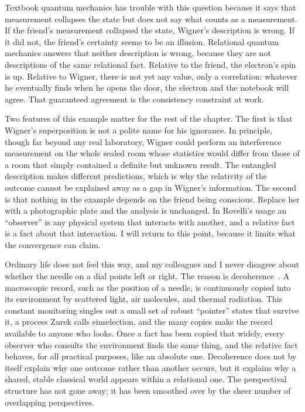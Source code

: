 Textbook quantum mechanics has trouble with this question because it says that measurement collapses the state but does not say what counts as a measurement.
If the friend's measurement collapsed the state, Wigner's description is wrong.
If it did not, the friend's certainty seems to be an illusion.
Relational quantum mechanics answers that neither description is wrong, because they are not descriptions of the same relational fact.
Relative to the friend, the electron's spin is up.
Relative to Wigner, there is not yet any value, only a correlation: whatever he eventually finds when he opens the door, the electron and the notebook will agree.
That guaranteed agreement is the consistency constraint at work.

Two features of this example matter for the rest of the chapter.
The first is that Wigner's superposition is not a polite name for his ignorance.
In principle, though far beyond any real laboratory, Wigner could perform an interference measurement on the whole sealed room whose statistics would differ from those of a room that simply contained a definite but unknown result.
The entangled description makes different predictions, which is why the relativity of the outcome cannot be explained away as a gap in Wigner's information.
The second is that nothing in the example depends on the friend being conscious.
Replace her with a photographic plate and the analysis is unchanged.
In Rovelli's usage an ``observer'' is any physical system that interacts with another, and a relative fact is a fact about that interaction.
I will return to this point, because it limits what the convergence can claim.

Ordinary life does not feel this way, and my colleagues and I never disagree about whether the needle on a dial points left or right.
The reason is decoherence~\citep{Zurek2003}.
A macroscopic record, such as the position of a needle, is continuously copied into its environment by scattered light, air molecules, and thermal radiation.
This constant monitoring singles out a small set of robust ``pointer'' states that survive it, a process Zurek calls einselection, and the many copies make the record available to anyone who looks.
Once a fact has been copied that widely, every observer who consults the environment finds the same thing, and the relative fact behaves, for all practical purposes, like an absolute one.
Decoherence does not by itself explain why one outcome rather than another occurs, but it explains why a shared, stable classical world appears within a relational one.
The perspectival structure has not gone away; it has been smoothed over by the sheer number of overlapping perspectives.

